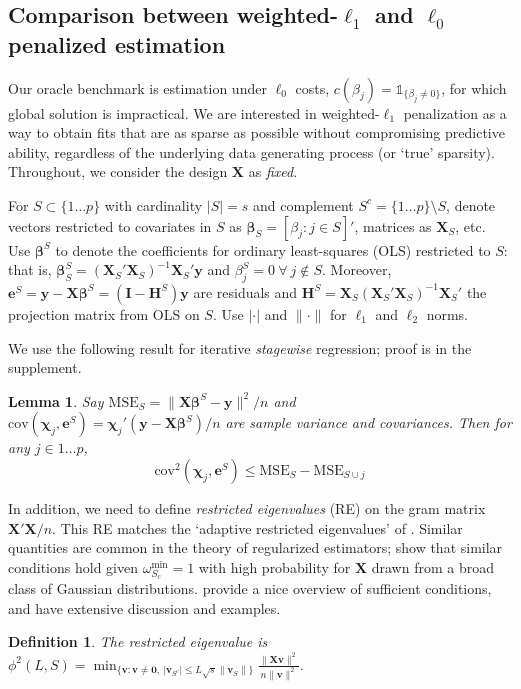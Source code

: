 \documentclass[12pt]{article}
\newtheorem{definition}{\sc Definition}[section]
\newtheorem{lemma}{\sc Lemma}[section]
\newcommand{\bs}[1]{\boldsymbol{#1}}
\newcommand{\mr}[1]{\mathrm{#1}}
\newcommand{\bm}[1]{\mathbf{#1}}
\newcommand{\ds}[1]{\mathds{#1}}
\begin{document}
\subsection{Comparison between weighted-$\ell_1$ and $\ell_0$ penalized estimation}


Our oracle benchmark is estimation under $\ell_0$ costs, $c(\beta_j) =
\ds{1}_{\{\beta_j\neq0\}}$, for which global solution is impractical.   We are
interested in weighted-$\ell_1$ penalization as a way to obtain fits that are as
sparse as possible without compromising predictive ability, regardless of the
underlying data generating process (or `true' sparsity).  Throughout, we consider the design $\bm{X}$ as {\it fixed}.

 For  $S \subset \{1\ldots p\}$ with cardinality $|S|=s$ and complement $S^c =
\{1\ldots p\}\setminus S$, denote vectors restricted to covariates in $S$ as
$\bm{\beta}_S = [\beta_j:j\in S]'$, matrices as $\bm{X}_S$, etc.  Use
$\bs{\beta}^S$ to denote the coefficients for ordinary least-squares (OLS)
restricted to $S$: that is, $\bs{\beta}^S_S =
(\bm{X}_S'\bm{X}_S)^{-1}\bm{X}_S'\bm{y}$ and $\beta^{S}_j = 0~\forall~j\notin
S$.  Moreover, $\bm{e}^S = \bm{y}-\bm{X}\bs{\beta}^S =
(\bm{I}-\bm{H}^S)\bm{y}$ are residuals and $\bm{H}^S =
\bm{X}_S(\bm{X}_S'\bm{X}_S)^{-1}\bm{X}_S'$ the projection matrix from OLS on $S$.  
Use $|\cdot|$ and $\|\cdot\|$ for $\ell_1$ and $\ell_2$ norms.

We use the following result for iterative \textit{stagewise} regression; proof is in the supplement. 
\begin{lemma}\label{SSElemma}
Say $\mr{MSE}_S = \|\bm{X}\bs{\beta}^S-\bm{y}\|^2/n$ and 
$\mr{cov}(\bs{\chi}_j,\bm{e}^S) = \bs{\chi}_j'(\bm{y}-\bm{X}\bs{\beta}^S)/n$ are sample variance and covariances.  Then for any $j \in 1\ldots p$, 
\[
\mr{cov}^2(\bs{\chi}_j,\bm{e}^S) \leq \mr{MSE}_S - \mr{MSE}_{S\cup j}
\]
\end{lemma}

In addition, we need to define {\it restricted eigenvalues} (RE) on the gram matrix $\bm{X}'\bm{X}/n$.
  This  RE  matches the `adaptive restricted eigenvalues' of \cite{buhlmann_statistics_2011}.  
Similar quantities are common in the theory of regularized estimators; \cite{raskutti_restricted_2010} show that similar conditions hold given  $\omega^{\mr{min}}_{S_c}=1$ with high probability for $\bm{X}$ drawn from a broad class of Gaussian distributions.  \cite{bickel_simultaneous_2009} provide a nice overview of sufficient conditions, and \cite{buhlmann_statistics_2011} have extensive discussion and examples.  
\begin{definition}\label{redef}
The restricted eigenvalue is
$
\phi^2(L,S) = \min_{\{\bm{v}: \bm{v}\neq \bm{0},~|\bm{v}_{S^c}| \leq L\sqrt{s}\|\bm{v}_S\|\}}\frac{\|\bm{X}\bm{v}\|^2}{n\|\bm{v}\|^2}$.
\end{definition}
\end{document}
